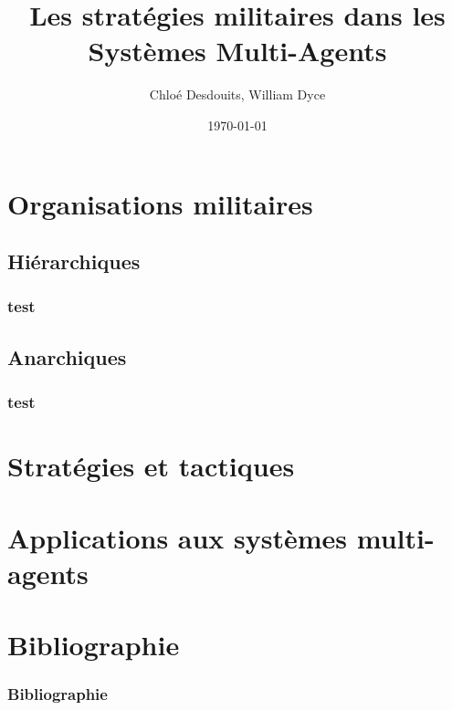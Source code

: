 \documentclass[utf8]{beamer}
\title{Les stratégies militaires dans les Systèmes Multi-Agents}
\author{Chloé Desdouits, William Dyce}
\date{\today}
\begin{document}
\frame{\titlepage}

\begin{frame}
  \tableofcontents
\end{frame} 

\section{Organisations militaires}
\frame{\sectionpage}

\subsection{Hiérarchiques}
\begin{frame}
\frametitle{test}
\end{frame}

\subsection{Anarchiques}
\begin{frame}
\frametitle{test}
\end{frame}


\section{Stratégies et tactiques}
\frame{\sectionpage}


\section{Applications aux systèmes multi-agents}
\frame{\sectionpage}

\section{Bibliographie}

\begin{frame}
\frametitle{Bibliographie}

\end{frame}
\end{document}
